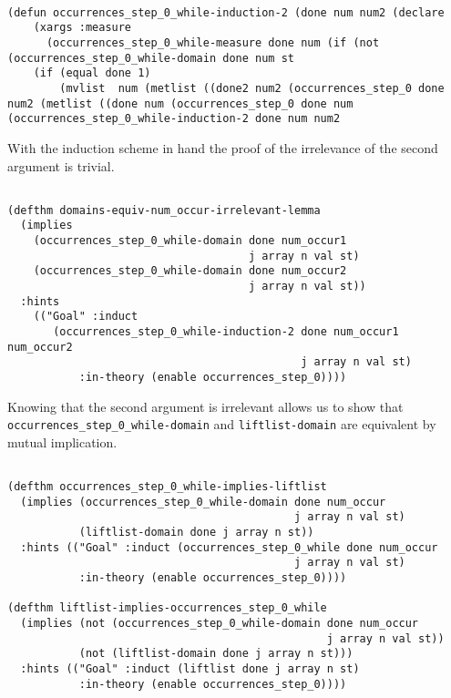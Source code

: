 \documentclass{eptcs}
\begin{document}
\begin{verbatim}

(defun occurrences_step_0_while-induction-2 (done num num2 (declare 
    (xargs :measure 
      (occurrences_step_0_while-measure done num (if (not (occurrences_step_0_while-domain done num st
    (if (equal done 1)
        (mvlist  num (metlist ((done2 num2 (occurrences_step_0 done num2 (metlist ((done num (occurrences_step_0 done num (occurrences_step_0_while-induction-2 done num num2 

\end{verbatim}

With the induction scheme in hand the proof of the irrelevance of the
second argument is trivial.

\begin{verbatim}

(defthm domains-equiv-num_occur-irrelevant-lemma
  (implies 
    (occurrences_step_0_while-domain done num_occur1
                                     j array n val st)
    (occurrences_step_0_while-domain done num_occur2
                                     j array n val st))
  :hints
    (("Goal" :induct
       (occurrences_step_0_while-induction-2 done num_occur1 num_occur2
                                             j array n val st)
           :in-theory (enable occurrences_step_0))))

\end{verbatim}

Knowing that the second argument is irrelevant allows us to show that
\texttt{occurrences\_step\_0\_while-domain} and
\texttt{liftlist-domain} are equivalent by mutual implication.
\begin{verbatim}

(defthm occurrences_step_0_while-implies-liftlist
  (implies (occurrences_step_0_while-domain done num_occur
                                            j array n val st)
           (liftlist-domain done j array n st))
  :hints (("Goal" :induct (occurrences_step_0_while done num_occur
                                            j array n val st)
           :in-theory (enable occurrences_step_0))))

(defthm liftlist-implies-occurrences_step_0_while
  (implies (not (occurrences_step_0_while-domain done num_occur
                                                 j array n val st))
           (not (liftlist-domain done j array n st)))
  :hints (("Goal" :induct (liftlist done j array n st)
           :in-theory (enable occurrences_step_0))))

\end{verbatim}
\end{document}
